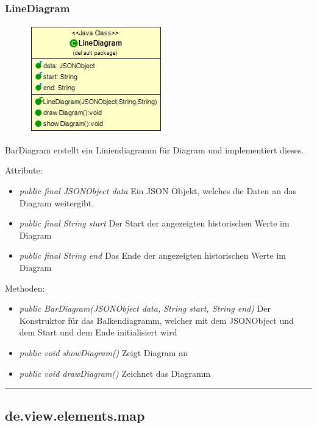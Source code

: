 \subsubsection{LineDiagram}
\begin{minipage}{0.3\textwidth}
    \begin{figure}[H]
        {\centering\includegraphics[scale = 0.5
        ]{media/view/diagram/LineDiagram_Class.png}}
    \end{figure}
    \end{minipage} \hfill
    \begin{minipage}{0.6\textwidth}
BarDiagram erstellt ein Liniendiagramm für Diagram und implementiert dieses.
\end{minipage}
\vspace{\baselineskip}
Attribute: \begin{itemize} [noitemsep]
    \item \emph{public final JSONObject data} Ein JSON Objekt, welches die Daten an das Diagram weitergibt.
    \item \emph{public final String start} Der Start der angezeigten historischen Werte im Diagram
    \item \emph{public final String end} Das Ende der angezeigten historischen Werte im Diagram
\end{itemize}
Methoden: \begin{itemize} [noitemsep]
    \item \emph{public BarDiagram(JSONObject data, String start, String end)} Der Konstruktor für das Balkendiagramm, welcher mit dem JSONObject und dem Start und dem Ende initialisiert wird
    \item \emph{public void showDiagram()} Zeigt Diagram an
    \item \emph{public void drawDiagram()} Zeichnet das Diagramm
\end{itemize}

\rule{\textwidth}{0.4pt}
\subsection{de.view.elements.map}

